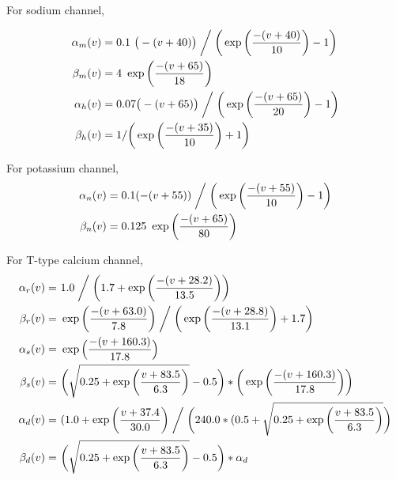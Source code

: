 For sodium channel, %

\begin{align*} 
\alpha_{m}(v) &= 0.1\  \big(-(v+40)\big)  \biggm/  \bigg( \exp \bigg( \frac{-(v+40)}{10} \bigg) - 1 \bigg)\\
\beta_{m}(v) &= 4\ \exp \bigg(\frac{-(v+65)}{18}\bigg)\\
\alpha_{h}(v) &= 0.07\big(-(v+65)\big)  \biggm/  \bigg( \exp \bigg( \frac{-(v+65)}{20} \bigg) - 1 \bigg)\\
\beta_{h}(v) &= 1 / \bigg( \exp \bigg(\frac{-(v+35)}{10}\bigg) + 1 \bigg)\\
\end{align*}

For potassium channel, %
\begin{align*}
\alpha_{n}(v)&=0.1(-(v+55))  \biggm/  \bigg( \exp \bigg( \frac{-(v+55)}{10} \bigg) - 1 \bigg)\\
\beta_{n}(v)&=0.125\ \exp \bigg(\frac{-(v+65)}{80}\bigg)\\
\end{align*}

For T-type calcium channel, %
\begin{align*} %
\alpha_{r}(v) =&\ 1.0\biggm/ \bigg(1.7+\exp\bigg(\frac{-(v+28.2)}{13.5}\bigg)\bigg)  \\
\beta_{r}(v) =&\ \exp\bigg(\frac{-(v+63.0)}{7.8}\bigg) \biggm/  \bigg( \exp \bigg( \frac{-(v+28.8)}{13.1} \bigg) +1.7\bigg)\\
\alpha_{s}(v) =&\ \exp \Big(\frac{-(v+160.3)}{17.8}\Big)\\
\beta_{s}(v) =&\ \bigg(\sqrt{0.25+\exp\bigg(\frac{v+83.5}{6.3}\bigg)}-0.5\bigg) *  \bigg(\exp\bigg(\frac{-(v+160.3)}{17.8}\bigg)\bigg)\\
\alpha_{d}(v) =&\ (1.0+\exp\bigg(\frac{v+37.4}{30.0}\bigg) \biggm/ \bigg(240.0*(0.5+ \sqrt{0.25+\exp\bigg(\frac{v+83.5}{6.3} \bigg) } \bigg) \\
\beta_{d}(v) =&\ \bigg(\sqrt{0.25+\exp\bigg(\frac{v+83.5}{6.3} \bigg) } -0.5\bigg)*\alpha_d\\  
\end{align*}

